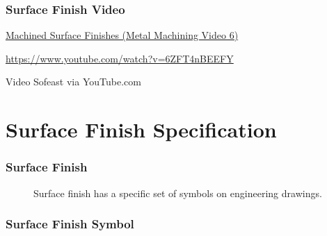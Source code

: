\begin{frame}
	\frametitle{Surface Finish Video}

    \centering
    {\large \href{https://www.youtube.com/watch?v=6ZFT4nBEEFY}{Machined Surface Finishes (Metal Machining Video 6)}\par}

    \vspace{0.5em}
    {\footnotesize \href{https://www.youtube.com/watch?v=6ZFT4nBEEFY}{https://www.youtube.com/watch?v=6ZFT4nBEEFY}\par}

    \vspace{0.5em}
    {\tiny Video \textcopyright{} Sofeast via YouTube.com\par}
\end{frame}

\section{Surface Finish Specification}

\begin{frame}
	\frametitle{Surface Finish}

    \begin{figure}
        \centering
        \resizebox{\linewidth}{!}{
            
        }

        \vspace{0.5em}
        {\footnotesize Surface finish has a specific set of symbols on engineering drawings.\par}
    \end{figure}
\end{frame}

\begin{frame}
	\frametitle{Surface Finish Symbol}

    \begin{figure}
        \centering
        \resizebox{\linewidth}{!}{
            
        }
    \end{figure}
\end{frame}

